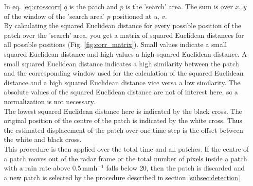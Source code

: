 \documentclass[11pt,twoside,a4paper,fleqn,x11names]{report}
\numberwithin{equation}{chapter}
\numberwithin{figure}{chapter}
\numberwithin{table}{chapter}
\begin{document}
In eq. \ref{eq:crosscorr} $q$ is the patch and $p$ is the 'search' area. The sum is over $x$, $y$ of the window of the 'search area' $p$ positioned at $u$, $v$.\\
By calculating the squared Euclidean distance for every possible position of the patch over the 'search' area, you get a matrix of squared Euclidean distances for all possible positions (Fig. \ref{fig:corr_matrix}). Small values indicate a small squared Euclidean distance and high values a high squared Euclidean distance. A small squared Euclidean distance indicates a high similarity between the patch and the corresponding window used for the calculation of the squared Euclidean distance and a high squared Euclidean distance vice versa a low similarity. The absolute values of the squared Euclidean distance are not of interest here, so a normalization is not necessary. \\
The lowest squared Euclidean distance here is indicated by the black cross. The original position of the centre of the patch is indicated by the white cross. Thus the estimated displacement of the patch over one time step is the offset between the white and black cross.\\
This procedure is then applied over the total time and all patches. If the centre of a patch moves out of the radar frame or the total number of pixels inside a patch with a rain rate above 0.5\,mmh$ ^{-1}$ falls below 20, then the patch is discarded and a new patch is selected by the procedure described in section \ref{subsec:detection}. 
\end{document}
